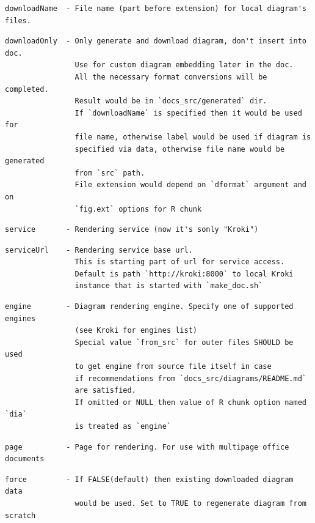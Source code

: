 \documentclass[
  12pt,
  a4paper,
  12pt,
  oneside,
  openany]{book}
\begin{document}
\begin{verbatim}
downloadName  - File name (part before extension) for local diagram's files.
\end{verbatim}

\begin{verbatim}
downloadOnly  - Only generate and download diagram, don't insert into doc.
                Use for custom diagram embedding later in the doc.
                All the necessary format conversions will be completed.
                Result would be in `docs_src/generated` dir.
                If `downloadName` is specified then it would be used for
                file name, otherwise label would be used if diagram is
                specified via data, otherwise file name would be generated
                from `src` path.
                File extension would depend on `dformat` argument and on
                `fig.ext` options for R chunk
\end{verbatim}

\begin{verbatim}
service       - Rendering service (now it's sonly "Kroki")
\end{verbatim}

\begin{verbatim}
serviceUrl    - Rendering service base url.
                This is starting part of url for service access.
                Default is path `http://kroki:8000` to local Kroki
                instance that is started with `make_doc.sh`
\end{verbatim}

\begin{verbatim}
engine        - Diagram rendering engine. Specify one of supported engines
                (see Kroki for engines list)
                Special value `from_src` for outer files SHOULD be used
                to get engine from source file itself in case
                if recommendations from `docs_src/diagrams/README.md`
                are satisfied.
                If omitted or NULL then value of R chunk option named `dia`
                is treated as `engine`
\end{verbatim}

\begin{verbatim}
page          - Page for rendering. For use with multipage office documents
\end{verbatim}

\begin{verbatim}
force         - If FALSE(default) then existing downloaded diagram data
                would be used. Set to TRUE to regenerate diagram from scratch
\end{verbatim}
\end{document}
